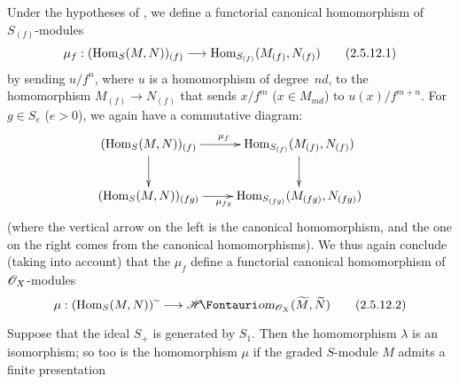 \begin{env}[2.5.12]
\label{II.2.5.12}
Under the hypotheses of , we define a functorial canonical homomorphism of $S_{(f)}$-modules
\[
\label{II.2.5.12.1}
  \mu_f: (\Hom_S(M,N))_{(f)} \to \Hom_{S_{(f)}}(M_{(f)},N_{(f)})
\tag{2.5.12.1}
\]
by sending $u/f^n$, where $u$ is a homomorphism of degree~$nd$, to the homomorphism $M_{(f)}\to N_{(f)}$ that sends $x/f^m$ ($x\in M_{md}$) to $u(x)/f^{m+n}$.
For $g\in S_e$ ($e>0$), we again have a commutative diagram:
\[
  \xymatrix{
    (\Hom_S(M,N))_{(f)} \ar[r]^{\mu_f} \ar[d]
    & \Hom_{S_{(f)}}(M_{(f)},N_{(f)}) \ar[d]
  \\(\Hom_S(M,N))_{(fg)} \ar[r]_{\mu_{fg}}
    & \Hom_{S_{(fg)}}(M_{(fg)},N_{(fg)})
  }
\]
(where the vertical arrow on the left is the canonical homomorphism, and the one on the right comes from the canonical homomorphisms).
We thus again conclude (taking  into account) that the $\mu_f$ define a functorial canonical homomorphism of $\mathscr{O}_X$-modules
\[
\label{II.2.5.12.2}
  \mu: (\Hom_S(M,N))\supertilde \to \shHom_{\sh{O}_X}(\widetilde{M},\widetilde{N})
\tag{2.5.12.2}
\]
\end{env}

\begin{proposition}[2.5.13]
\label{II.2.5.13}
Suppose that the ideal $S_+$ is generated by $S_1$.
Then the homomorphism $\lambda$  is an isomorphism;
so too is the homomorphism $\mu$  if the graded $S$-module $M$ admits a finite presentation 
\end{proposition}

